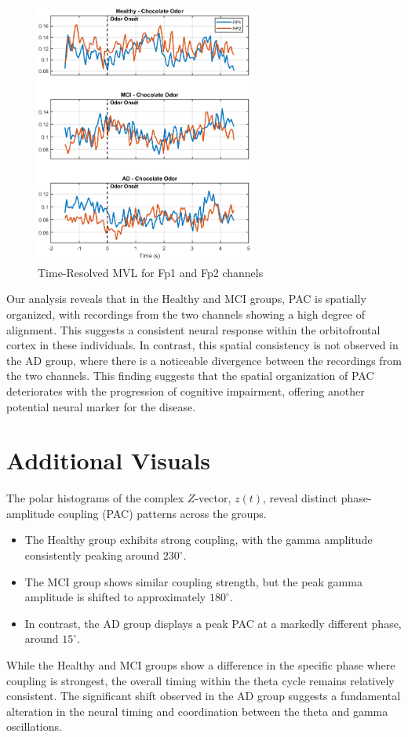 \documentclass[hidelinks,12pt]{article}
\begin{document}
	\begin{figure}[h!]
		\centering
		\includegraphics[width=0.65\textwidth]{21}
		\caption{Time-Resolved MVL for Fp1 and Fp2 channels}
	\end{figure}
	
	\newpage
	
	
	Our analysis reveals that in the Healthy and MCI groups, PAC is spatially organized, with recordings from the two channels showing a high degree of alignment. This suggests a consistent neural response within the orbitofrontal cortex in these individuals.
	\bigbreak
	In contrast, this spatial consistency is not observed in the AD group, where there is a noticeable divergence between the recordings from the two channels. This finding suggests that the spatial organization of PAC deteriorates with the progression of cognitive impairment, offering another potential neural marker for the disease.
	
	\section{Additional Visuals}
	The polar histograms of the complex $Z$-vector, $z(t)$, reveal distinct phase-amplitude coupling (PAC) patterns across the groups.  
	\begin{itemize}
		\item The Healthy group exhibits strong coupling, with the gamma amplitude consistently peaking around $230^{\circ}$.  
		
		\item The MCI group shows similar coupling strength, but the peak gamma amplitude is shifted to approximately $180^{\circ}$.  
		
		\item In contrast, the AD group displays a peak PAC at a markedly different phase, around $15^{\circ}$.  
	\end{itemize}
	While the Healthy and MCI groups show a difference in the specific phase where coupling is strongest, the overall timing within the theta cycle remains relatively consistent. The significant shift observed in the AD group suggests a fundamental alteration in the neural timing and coordination between the theta and gamma oscillations.
	
\end{document}
